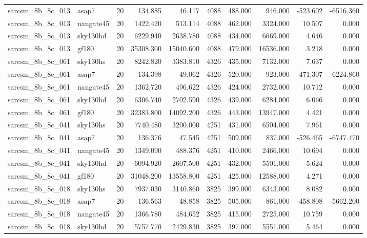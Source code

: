 \documentclass{article}
\begin{document}
\begin{longtable}{llrrrrrrrr}
sarcsm\_8b\_8c\_013 & asap7 & 20 & 134.885 & 46.117 & 4088 & 488.000 & 946.000 & -523.602 & -6516.360 \\
sarcsm\_8b\_8c\_013 & nangate45 & 20 & 1422.420 & 513.114 & 4088 & 462.000 & 3324.000 & 10.507 & 0.000 \\
sarcsm\_8b\_8c\_013 & sky130hd & 20 & 6229.940 & 2638.780 & 4088 & 434.000 & 6669.000 & 4.646 & 0.000 \\
sarcsm\_8b\_8c\_013 & gf180 & 20 & 35308.300 & 15040.600 & 4088 & 479.000 & 16536.000 & 3.218 & 0.000 \\
sarcsm\_8b\_8c\_061 & sky130hs & 20 & 8242.820 & 3383.810 & 4326 & 435.000 & 7132.000 & 7.637 & 0.000 \\
sarcsm\_8b\_8c\_061 & asap7 & 20 & 134.398 & 49.062 & 4326 & 520.000 & 923.000 & -471.307 & -6224.860 \\
sarcsm\_8b\_8c\_061 & nangate45 & 20 & 1362.720 & 496.622 & 4326 & 424.000 & 2732.000 & 10.712 & 0.000 \\
sarcsm\_8b\_8c\_061 & sky130hd & 20 & 6306.740 & 2702.590 & 4326 & 439.000 & 6284.000 & 6.066 & 0.000 \\
sarcsm\_8b\_8c\_061 & gf180 & 20 & 32383.800 & 14092.200 & 4326 & 443.000 & 13947.000 & 4.421 & 0.000 \\
sarcsm\_8b\_8c\_041 & sky130hs & 20 & 7740.480 & 3200.000 & 4251 & 431.000 & 6504.000 & 7.961 & 0.000 \\
sarcsm\_8b\_8c\_041 & asap7 & 20 & 136.376 & 47.545 & 4251 & 509.000 & 837.000 & -526.465 & -6747.470 \\
sarcsm\_8b\_8c\_041 & nangate45 & 20 & 1349.090 & 488.376 & 4251 & 410.000 & 2466.000 & 10.694 & 0.000 \\
sarcsm\_8b\_8c\_041 & sky130hd & 20 & 6094.920 & 2607.500 & 4251 & 432.000 & 5501.000 & 5.624 & 0.000 \\
sarcsm\_8b\_8c\_041 & gf180 & 20 & 31048.200 & 13558.800 & 4251 & 425.000 & 12588.000 & 4.271 & 0.000 \\
sarcsm\_8b\_8c\_018 & sky130hs & 20 & 7937.030 & 3140.860 & 3825 & 399.000 & 6343.000 & 8.082 & 0.000 \\
sarcsm\_8b\_8c\_018 & asap7 & 20 & 136.563 & 48.858 & 3825 & 505.000 & 861.000 & -458.808 & -5662.200 \\
sarcsm\_8b\_8c\_018 & nangate45 & 20 & 1366.780 & 484.652 & 3825 & 415.000 & 2725.000 & 10.759 & 0.000 \\
sarcsm\_8b\_8c\_018 & sky130hd & 20 & 5757.770 & 2429.830 & 3825 & 397.000 & 5551.000 & 5.464 & 0.000 \\

\end{longtable}
\end{document}
